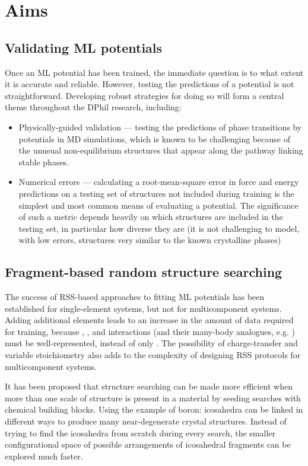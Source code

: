 \documentclass[12pt,a4paper,twoside,nobind]{ociamthesis}
\begin{document}
\section{Aims}

\subsection*{Validating ML potentials}
Once an ML potential has been trained, the immediate question is to what extent it is accurate and reliable. However, testing the predictions of a potential is not straightforward.\autocite{Zuo2020} Developing robust strategies
for doing so will form a central theme throughout the DPhil research, including:
\begin{itemize}
  \item Physically-guided validation --- testing the predictions of phase transitions by potentials in MD simulations, which is known to be challenging because of the unusual non-equilibrium structures
        that appear along the pathway linking stable phases.\autocite{Deringer2021} 
  \item Numerical errors --- calculating a root-mean-square error in force and energy predictions on a testing set of structures not included during training is the simplest and most common means
        of evaluating a potential. The significance of such a metric depends heavily on which structures are included in the testing set, in particular how diverse they are (it is not challenging to 
        model, with low errors, structures very similar to the known crystalline phases)
\end{itemize}

\subsection*{Fragment-based random structure searching}

The success of RSS-based approaches to fitting ML potentials has been established for single-element systems, but not for multicomponent systems.
Adding additional elements leads to an increase in the amount of data required for training, because , , and  interactions (and their many-body analogues, e.g. ) must
be well-represented, instead of only . The possibility of charge-transfer and variable stoichiometry also adds to the complexity of designing RSS protocols for multicomponent systems.

It has been proposed that structure searching can be made more efficient when more than one scale of structure
is present in a material by seeding searches with chemical building blocks.\autocite{Ahnert2017, Deringer2018c, Deringer2020}
Using the example of boron: icosahedra can be linked in different ways to produce many near-degenerate crystal structures.
Instead of trying to find the icosahedra from scratch during every search, the smaller configurational space of possible arrangements of icosahedral fragments can be explored
much faster.
\end{document}
